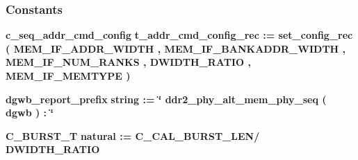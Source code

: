 \subsubsection*{Constants}
 \begin{DoxyCompactItemize}
\item 
{\bf c\+\_\+seq\+\_\+addr\+\_\+cmd\+\_\+config} {\bfseries {\bfseries {\bf t\+\_\+addr\+\_\+cmd\+\_\+config\+\_\+rec}} \textcolor{vhdlchar}{ }\textcolor{vhdlchar}{ }\textcolor{vhdlchar}{\+:}\textcolor{vhdlchar}{=}\textcolor{vhdlchar}{ }\textcolor{vhdlchar}{ }\textcolor{vhdlchar}{ }\textcolor{vhdlchar}{ }\textcolor{vhdlchar}{set\+\_\+config\+\_\+rec}\textcolor{vhdlchar}{ }\textcolor{vhdlchar}{(}\textcolor{vhdlchar}{ }\textcolor{vhdlchar}{ }\textcolor{vhdlchar}{ }\textcolor{vhdlchar}{ }{\bfseries {\bf M\+E\+M\+\_\+\+I\+F\+\_\+\+A\+D\+D\+R\+\_\+\+W\+I\+D\+TH}} \textcolor{vhdlchar}{ }\textcolor{vhdlchar}{,}\textcolor{vhdlchar}{ }\textcolor{vhdlchar}{ }\textcolor{vhdlchar}{ }\textcolor{vhdlchar}{ }{\bfseries {\bf M\+E\+M\+\_\+\+I\+F\+\_\+\+B\+A\+N\+K\+A\+D\+D\+R\+\_\+\+W\+I\+D\+TH}} \textcolor{vhdlchar}{ }\textcolor{vhdlchar}{,}\textcolor{vhdlchar}{ }\textcolor{vhdlchar}{ }\textcolor{vhdlchar}{ }\textcolor{vhdlchar}{ }{\bfseries {\bf M\+E\+M\+\_\+\+I\+F\+\_\+\+N\+U\+M\+\_\+\+R\+A\+N\+KS}} \textcolor{vhdlchar}{ }\textcolor{vhdlchar}{,}\textcolor{vhdlchar}{ }\textcolor{vhdlchar}{ }\textcolor{vhdlchar}{ }\textcolor{vhdlchar}{ }{\bfseries {\bf D\+W\+I\+D\+T\+H\+\_\+\+R\+A\+T\+IO}} \textcolor{vhdlchar}{ }\textcolor{vhdlchar}{,}\textcolor{vhdlchar}{ }\textcolor{vhdlchar}{ }\textcolor{vhdlchar}{ }\textcolor{vhdlchar}{ }{\bfseries {\bf M\+E\+M\+\_\+\+I\+F\+\_\+\+M\+E\+M\+T\+Y\+PE}} \textcolor{vhdlchar}{ }\textcolor{vhdlchar}{)}\textcolor{vhdlchar}{ }} 
\item 
{\bf dgwb\+\_\+report\+\_\+prefix} {\bfseries \textcolor{comment}{string}\textcolor{vhdlchar}{ }\textcolor{vhdlchar}{ }\textcolor{vhdlchar}{\+:}\textcolor{vhdlchar}{=}\textcolor{vhdlchar}{ }\textcolor{vhdlchar}{ }\textcolor{vhdlchar}{ }\textcolor{vhdlchar}{ }\textcolor{keyword}{\char`\"{} ddr2\+\_\+phy\+\_\+alt\+\_\+mem\+\_\+phy\+\_\+seq ( dgwb )  \+:  \char`\"{}}\textcolor{vhdlchar}{ }} 
\item 
{\bf C\+\_\+\+B\+U\+R\+S\+T\+\_\+T} {\bfseries \textcolor{comment}{natural}\textcolor{vhdlchar}{ }\textcolor{vhdlchar}{ }\textcolor{vhdlchar}{\+:}\textcolor{vhdlchar}{=}\textcolor{vhdlchar}{ }\textcolor{vhdlchar}{ }\textcolor{vhdlchar}{ }\textcolor{vhdlchar}{ }\textcolor{vhdlchar}{C\+\_\+\+C\+A\+L\+\_\+\+B\+U\+R\+S\+T\+\_\+\+L\+EN}\textcolor{vhdlchar}{/}\textcolor{vhdlchar}{ }\textcolor{vhdlchar}{ }\textcolor{vhdlchar}{ }{\bfseries {\bf D\+W\+I\+D\+T\+H\+\_\+\+R\+A\+T\+IO}} \textcolor{vhdlchar}{ }} 

\end{DoxyCompactItemize}
